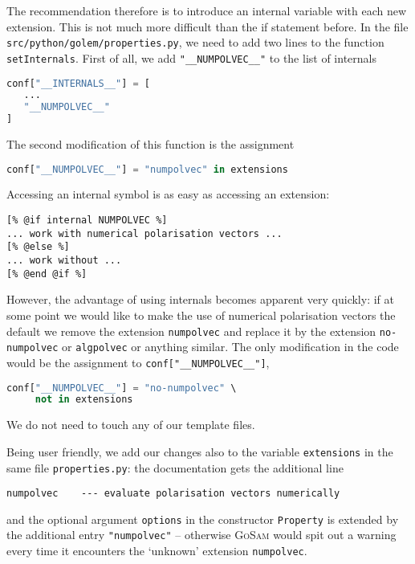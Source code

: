 \documentclass[11pt,a4paper]{refrep}
\newcommand{\golem}{\textsc{GoSam}\xspace}
\begin{document}
The recommendation therefore is to introduce an internal variable
with each new extension. This is not much more difficult than the
if statement before. In the file
\texttt{src/\hspace{0pt}python/\hspace{0pt}golem/\hspace{0pt}properties.py},
we need to add two lines to the function \texttt{setInternals}.
First of all, we add \texttt{"\_\_NUMPOLVEC\_\_"} to the list of internals
\begin{lstlisting}[language=Python]
conf["__INTERNALS__"] = [
   ...
   "__NUMPOLVEC__"
]
\end{lstlisting}
The second modification of this function is the assignment
\begin{lstlisting}[language=Python]
conf["__NUMPOLVEC__"] = "numpolvec" in extensions
\end{lstlisting}

Accessing an internal symbol is as easy as accessing an extension:
\begin{lstlisting}
[% @if internal NUMPOLVEC %]
... work with numerical polarisation vectors ...
[% @else %]
... work without ...
[% @end @if %]
\end{lstlisting}
However, the advantage of using internals becomes apparent very
quickly: if at some point we would like to make the use of numerical
polarisation vectors the default we remove the extension \texttt{numpolvec}
and replace it by the extension \texttt{no-numpolvec} or \texttt{algpolvec}
or anything similar. The only modification in the code would be the
assignment to \texttt{conf["\_\_NUMPOLVEC\_\_"]},
\begin{lstlisting}[language=Python]
conf["__NUMPOLVEC__"] = "no-numpolvec" \
     not in extensions
\end{lstlisting}
We do not need to touch any of our template files.

Being user friendly, we add our changes also to the variable
\texttt{extensions} in the same file \texttt{properties.py}:
the documentation gets the additional line
\begin{verbatim}
numpolvec    --- evaluate polarisation vectors numerically
\end{verbatim}
and the optional argument \texttt{options} in the constructor
\texttt{Property} is extended by the additional entry
\texttt{"numpolvec"} -- otherwise \golem{} would spit out a warning
every time it encounters the `unknown' extension \texttt{numpolvec}.
\end{document}
